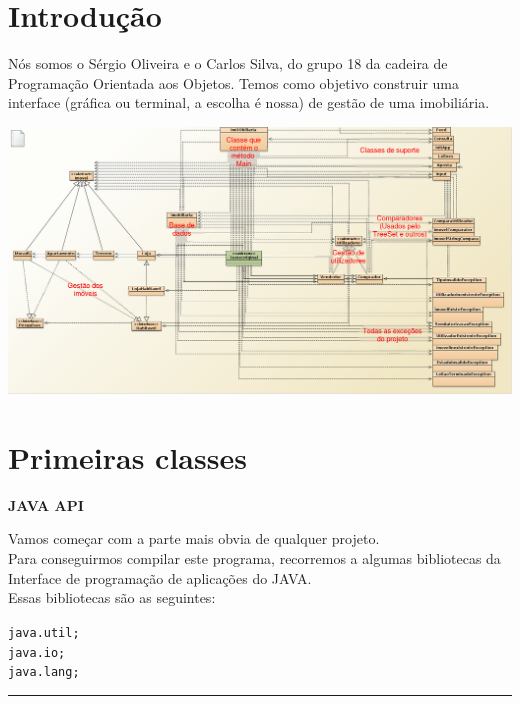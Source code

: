 \documentclass[12pt]{article}
\newenvironment{code}                    
{\textbf{
} \hspace{1cm} \hrulefill \\ 
\smallskip 
\begin{center}
\begin{minipage}{0.9\textwidth} 
\begin{alltt}\small}
{\end{alltt}
\end{minipage}
\end{center}
\hrule\smallskip
}
\begin{document}

\maketitle                                            %
\pagebreak

\section{Introdução}

Nós somos o Sérgio Oliveira e o Carlos Silva, do grupo 18 da cadeira de Programação Orientada aos Objetos. Temos como objetivo construir uma interface (gráfica ou terminal, a escolha é nossa) de gestão de uma imobiliária.


\includegraphics[scale=0.27]{004.png}	
\pagebreak

\section{Primeiras classes}

\textbf{JAVA API}
\newline

Vamos começar com a parte mais obvia de qualquer projeto.\\
Para conseguirmos compilar este programa, recorremos a algumas bibliotecas da Interface de programação de aplicações do JAVA.\\

Essas bibliotecas são as seguintes:
\newline
\begin{code}
java.util;
java.io;
java.lang;
\end{code}
\end{document}

